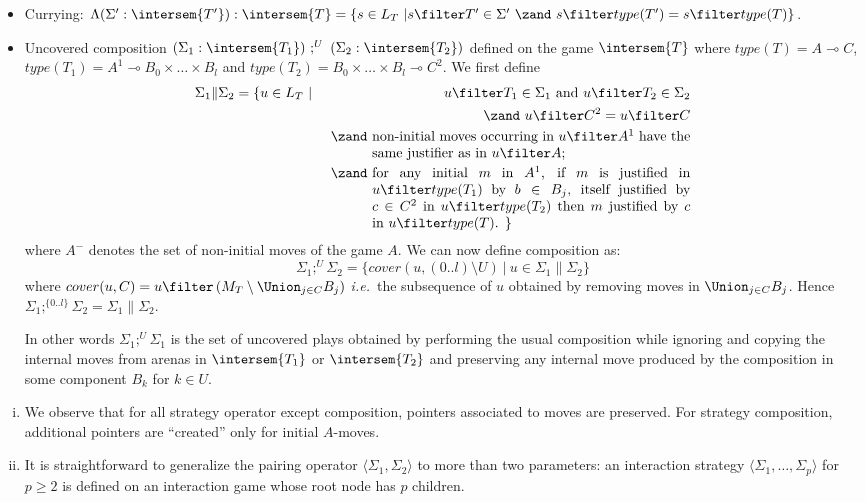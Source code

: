 \begin{definition}
\begin{itemize}[-]
\item Currying: $\Lambda(\Sigma' : \intersem{T'}) : \intersem{T} = \{ s \in L_T \ |  s \filter T' \in \Sigma' \ \zand\ s\filter type(T') = s\filter type(T) \}$.

\item Uncovered composition $(\Sigma_1 : \intersem{T_1})\ ;^U\ (\Sigma_2
:\intersem{T_2})$ defined on the game $\intersem{T}$ where
$type(T) = A \multimap C$, $type(T_1) = A^1 \multimap B_0 \times
\ldots \times B_l$ and $type(T_2) = B_0 \times \ldots \times B_l
\multimap C^2$. We first define
\begin{eqnarray*}
\Sigma_1 \| \Sigma_2 &= \{ u \in L_T  \ | \ & u \filter T_1 \in \Sigma_1 \mbox{ and } u \filter T_2 \in \Sigma_2 \\
&& \zand\ u\filter C^2 = u\filter C \\
&& \zand\ \parbox[t]{8cm}{non-initial moves occurring in $u\filter A^1$
have the same justifier as in $u\filter A$;} \\
&& \zand\ \parbox[t]{8cm}{for any initial $m$ in $A^1$, if $m$ is justified in $u \filter type(T_1)$ by $b\in B_j$,
itself justified by $c \in C^2$ in $u \filter type(T_2)$ then $m$ justified by $c$ in $u \filter type(T)$. \} }
\end{eqnarray*}
where $A^-$ denotes the set of non-initial moves of the game $A$. We can now define composition as:
$$ \Sigma_1 ;^U \Sigma_2 = \{ cover(u,(0..l)\setminus U) \ | \ u \in \Sigma_1 \| \Sigma_2 \}$$
where $cover(u,C) = u \filter \left( M_T \setminus \Union_{j\in
C} B_j \right)$ {\it i.e.}~the subsequence of $u$ obtained by
removing moves in $\Union_{j\in C} B_j$. Hence
$\Sigma_1;^{\{0..l\}} \Sigma_2 = \Sigma_1 \| \Sigma_2$.

In other words $\Sigma_1 ;^U \Sigma_1$ is the set of uncovered
plays obtained by performing the usual composition while
ignoring and copying the internal moves from arenas in
$\intersem{T_1}$ or $\intersem{T_2}$ and preserving any internal
move produced by the composition in some component $B_k$ for $k
\in U$.
\end{itemize}
\end{definition}

\begin{remark} \hfill
\label{rem:interstrat}
\begin{enumerate}[i.]
\item We observe that for all strategy operator
except composition, pointers associated to moves are preserved.
For strategy composition, additional pointers are
``created'' only for initial $A$-moves.
\item It is straightforward to generalize the pairing operator $\langle \Sigma_1, \Sigma_2 \rangle$ to more than two parameters: an interaction strategy $\langle \Sigma_1, \ldots, \Sigma_p \rangle$ for $p\geq2$
is defined on an interaction game whose root node has $p$ children.
\end{enumerate}
\end{remark}

